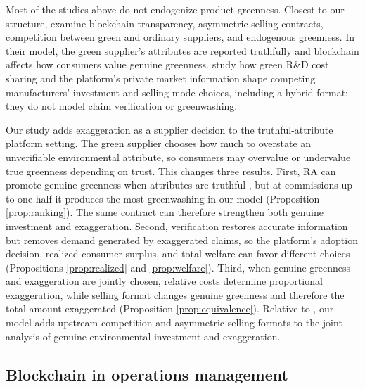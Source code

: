 \documentclass[preprint,review,12pt,authoryear,nopreprintline]{elsarticle}
\theoremstyle{definition}
\begin{document}
Most of the studies above do not endogenize product greenness. Closest to our structure, \citet{wu2025platform} examine blockchain transparency, asymmetric selling contracts, competition between green and ordinary suppliers, and endogenous greenness. In their model, the green supplier's attributes are reported truthfully and blockchain affects how consumers value genuine greenness. \citet{wuZhao2027cooperative} study how green R\&D cost sharing and the platform's private market information shape competing manufacturers' investment and selling-mode choices, including a hybrid format; they do not model claim verification or greenwashing.

Our study adds exaggeration as a supplier decision to the truthful-attribute platform setting. The green supplier chooses how much to overstate an unverifiable environmental attribute, so consumers may overvalue or undervalue true greenness depending on trust. This changes three results. First, RA can promote genuine greenness when attributes are truthful \citep{wu2025platform}, but at commissions up to one half it produces the most greenwashing in our model (Proposition \ref{prop:ranking}). The same contract can therefore strengthen both genuine investment and exaggeration. Second, verification restores accurate information but removes demand generated by exaggerated claims, so the platform's adoption decision, realized consumer surplus, and total welfare can favor different choices (Propositions \ref{prop:realized} and \ref{prop:welfare}). Third, when genuine greenness and exaggeration are jointly chosen, relative costs determine proportional exaggeration, while selling format changes genuine greenness and therefore the total amount exaggerated (Proposition \ref{prop:equivalence}). Relative to \citet{xu2025should}, our model adds upstream competition and asymmetric selling formats to the joint analysis of genuine environmental investment and exaggeration.

\subsection{Blockchain in operations management}\label{sec:2.3}
\end{document}
